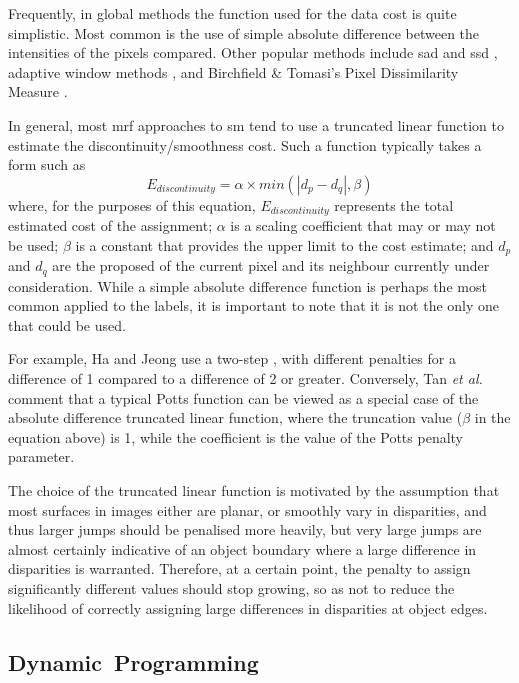 Frequently, in global methods the function used for the data cost is quite simplistic.  Most common is the use of simple absolute difference between the intensities of the pixels compared.  Other popular methods include \gls{sad} and \gls{ssd} \fxerror[inline]{[ref]}, adaptive window methods \cite{Yoon2005,Yoon2006}, and Birchfield \& Tomasi's Pixel Dissimilarity Measure \cite{Birchfield1998}.

In general, most \gls{mrf} approaches to \gls{sm} tend to use a truncated linear function to estimate the discontinuity/smoothness cost.  Such a function typically takes a form such as \[ E_{discontinuity} = \alpha \times min(| d_p - d_q |, \beta) \] where, for the purposes of this equation, \(E_{discontinuity}\) represents the total estimated cost of the assignment; \(\alpha\) is a scaling coefficient that may or may not be used; \(\beta\) is a constant that provides the upper limit to the cost estimate; and \(d_p\) and \(d_q\) are the proposed  of the current pixel and its neighbour currently under consideration.  While a simple absolute difference function is perhaps the most common applied to the labels, it is important to note that it is not the only one that could be used.  

For example, Ha and Jeong \cite{Ha2016} use a two-step , with different penalties for a difference of 1 compared to a difference of 2 or greater. Conversely, Tan \textit{et al.} \cite{Tan2017} comment that a typical Potts function can be viewed as a special case of the absolute difference truncated linear function, where the truncation value (\(\beta\) in the equation above) is 1, while the coefficient is the value of the Potts penalty parameter.

The choice of the truncated linear function is motivated by the assumption that most surfaces in images either are planar, or smoothly vary in disparities, and thus larger jumps should be penalised more heavily, but very large jumps are almost certainly indicative of an object boundary where a large difference in disparities is warranted.  Therefore, at a certain point, the penalty to assign significantly different values should stop growing, so as not to reduce the likelihood of correctly assigning large differences in disparities at object edges.

\subsection{Dynamic~Programming}

